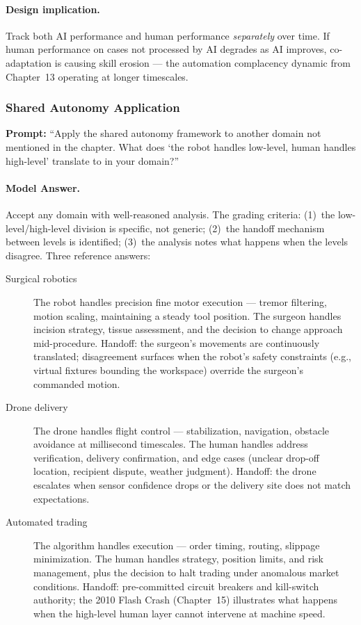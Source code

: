 \paragraph{Design implication.}

Track both AI performance and human performance \emph{separately} over time. If human performance on cases not processed by AI degrades as AI improves, co-adaptation is causing skill erosion --- the automation complacency dynamic from Chapter~13 operating at longer timescales.

\subsubsection{Shared Autonomy Application}

\textbf{Prompt:} ``Apply the shared autonomy framework to another domain not mentioned in the chapter. What does `the robot handles low-level, human handles high-level' translate to in your domain?''

\paragraph{Model Answer.}

Accept any domain with well-reasoned analysis. The grading criteria: (1)~the low-level/high-level division is specific, not generic; (2)~the handoff mechanism between levels is identified; (3)~the analysis notes what happens when the levels disagree. Three reference answers:

\begin{description}
    \item[Surgical robotics] The robot handles precision fine motor execution --- tremor filtering, motion scaling, maintaining a steady tool position. The surgeon handles incision strategy, tissue assessment, and the decision to change approach mid-procedure. Handoff: the surgeon's movements are continuously translated; disagreement surfaces when the robot's safety constraints (e.g., virtual fixtures bounding the workspace) override the surgeon's commanded motion.
    \item[Drone delivery] The drone handles flight control --- stabilization, navigation, obstacle avoidance at millisecond timescales. The human handles address verification, delivery confirmation, and edge cases (unclear drop-off location, recipient dispute, weather judgment). Handoff: the drone escalates when sensor confidence drops or the delivery site does not match expectations.
    \item[Automated trading] The algorithm handles execution --- order timing, routing, slippage minimization. The human handles strategy, position limits, and risk management, plus the decision to halt trading under anomalous market conditions. Handoff: pre-committed circuit breakers and kill-switch authority; the 2010 Flash Crash (Chapter~15) illustrates what happens when the high-level human layer cannot intervene at machine speed.
\end{description}

